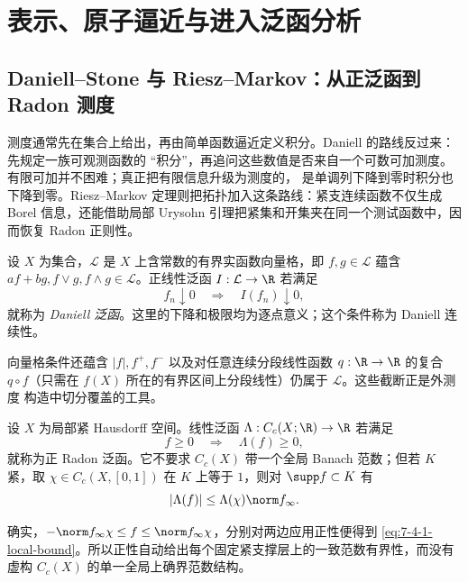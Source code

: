 \section{表示、原子逼近与进入泛函分析}\label{sec:07-04}

\subsection{Daniell--Stone 与 Riesz--Markov：从正泛函到 Radon 测度}\label{subsec:7-4-1}

测度通常先在集合上给出，再由简单函数逼近定义积分。Daniell 的路线反过来：先规定一族可观测函数的
“积分”，再追问这些数值是否来自一个可数可加测度。有限可加并不困难；真正把有限信息升级为测度的，
是单调列下降到零时积分也下降到零。Riesz--Markov 定理则把拓扑加入这条路线：紧支连续函数不仅生成
Borel 信息，还能借助局部 Urysohn 引理把紧集和开集夹在同一个测试函数中，因而恢复 Radon 正则性。

\begin{definition}[Daniell 泛函]\label{def:7-4-1-1}
设 $X$ 为集合，$\mathcal L$ 是 $X$ 上含常数的有界实函数向量格，即
$f,g\in\mathcal L$ 蕴含 $af+bg,f\vee g,f\wedge g\in\mathcal L$。正线性泛函
$I:\mathcal L\to\R$ 若满足
\[
 f_n\downarrow0\quad\Longrightarrow\quad I(f_n)\downarrow0,
\]
就称为 \emph{Daniell 泛函}。这里的下降和极限均为逐点意义；这个条件称为 Daniell 连续性。
\end{definition}

向量格条件还蕴含 $|f|,f^+,f^-$ 以及对任意连续分段线性函数 $q:\R\to\R$ 的复合
$q\circ f$（只需在 $f(X)$ 所在的有界区间上分段线性）仍属于 $\mathcal L$。这些截断正是外测度
构造中切分覆盖的工具。

\begin{definition}[正 Radon 泛函]\label{def:7-4-1-2}
设 $X$ 为局部紧 Hausdorff 空间。线性泛函 $\Lambda:C_c(X;\R)\to\R$ 若满足
\[
 f\ge0\quad\Longrightarrow\quad\Lambda(f)\ge0,
\]
就称为正 Radon 泛函。它不要求 $C_c(X)$ 带一个全局 Banach 范数；但若 $K$ 紧，取
$\chi\in C_c(X,[0,1])$ 在 $K$ 上等于 $1$，则对 $\supp f\subset K$ 有
\begin{equation}\label{eq:7-4-1-local-bound}
 |\Lambda(f)|\le \Lambda(\chi)\norm f_\infty.
\end{equation}
\end{definition}

确实，$-\norm f_\infty\chi\le f\le\norm f_\infty\chi$，分别对两边应用正性便得到
\eqref{eq:7-4-1-local-bound}。所以正性自动给出每个固定紧支撑层上的一致范数有界性，而没有虚构
$C_c(X)$ 的单一全局上确界范数结构。


